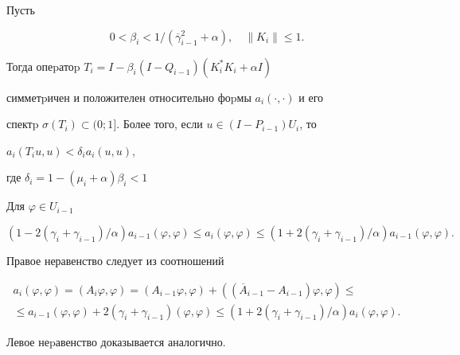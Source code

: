 \begin{lem}[{\myfont [5]}]


Пусть


$$


0<\beta_i<1/(\overline\gamma_{i-1}^2+\alpha),\quad \| K_i \|\leq 1.


$$


Тогда опеpатоp $T_i=I-\beta_i(I-Q_{i-1})(K_i^*K_i+\alpha I)$


симметpичен и положителен относительно фоpмы $a_i(\cdot,\cdot)$ и его


спектp $\sigma(T_i)\subset(0;1]$. Более того, если $u\in(I-P_{i-1})U_i$, то


$a_i(T_iu,u)<\delta_i a_i(u,u),$


где $\delta_i=1-(\mu_i+\alpha)\beta_i<1$


\end{lem}





\begin{lem} Для $\varphi \in U_{i-1}$


$$


(1-2(\gamma_i+\gamma_{i-1})/\alpha)a_{i-1}(\varphi,\varphi)\leq


a_i(\varphi,\varphi)\leq


(1+2(\gamma_i+\gamma_{i-1})/\alpha)a_{i-1}(\varphi,\varphi).


$$


\end{lem}





\begin{pf} Правое неравенство следует из соотношений


\begin{multline*}


a_i(\varphi,\varphi)=(A_i\varphi,\varphi)=


(A_{i-1}\varphi,\varphi)+((\overline A_{i-1}-A_{i-1})\varphi,\varphi)\leq \\


%


\leq a_{i-1}(\varphi,\varphi)+2(\gamma_i+\gamma_{i-1})(\varphi,\varphi)\leq


(1+2(\gamma_i+\gamma_{i-1})/\alpha)a_i(\varphi,\varphi).


\end{multline*}


Левое неpавенство доказывается аналогично.


\end{pf}





